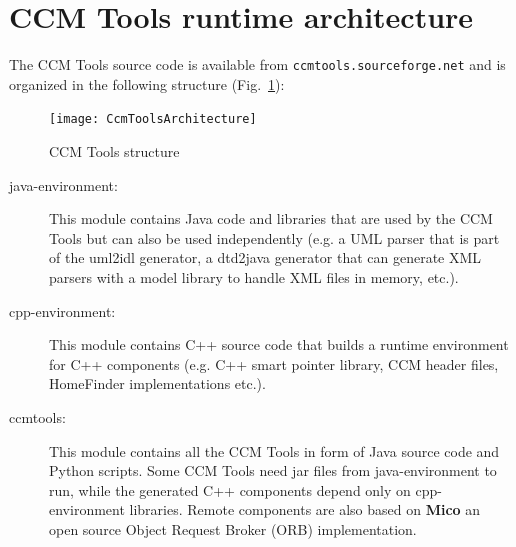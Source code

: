 \section{CCM Tools runtime architecture}

The CCM Tools source code is available from {\tt ccmtools.sourceforge.net}
and is organized in the following structure (Fig.~\ref{ccmtools-structure}):

\begin{figure}[htbp]
    \begin{center}
        \texttt{[image: CcmToolsArchitecture]}
        \caption{CCM Tools structure}
        \label{ccmtools-structure}
    \end{center}
\end{figure}

\begin{description}
\item [java-environment:]
This module contains Java code and libraries that are used by the CCM Tools
but can also be used independently (e.g. a UML parser that is part of the 
uml2idl generator, a dtd2java generator that can generate XML parsers with a 
model library to handle XML files in memory, etc.).
  
\item [cpp-environment:]
This module contains C++ source code that builds a runtime environment for
C++ components (e.g. C++ smart pointer library, CCM header files, HomeFinder
implementations etc.).

\item [ccmtools:]
This module contains all the CCM Tools in form of Java source code and Python
scripts.
Some CCM Tools need jar files from java-environment to run, while the generated C++ 
components depend only on cpp-environment libraries. 
Remote components are also based on {\bf Mico} \cite{MicoORB} an open source Object 
Request Broker (ORB) implementation.

\end{description}

\newpage

